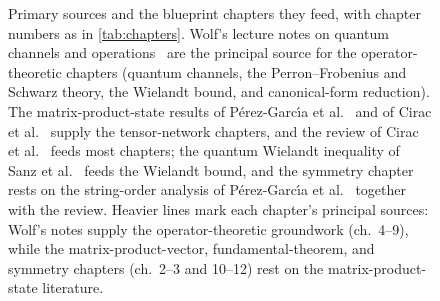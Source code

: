\begin{figure}[htbp]
\begin{tikzpicture}
    \end{tikzpicture}
    \caption{Primary sources and the blueprint chapters they feed, with chapter
        numbers as in \cref{tab:chapters}. Wolf's lecture notes on quantum
        channels and operations~\cite{Wolf2012Quantum} are the principal source
        for the operator-theoretic chapters (quantum channels, the
        Perron--Frobenius and Schwarz theory, the Wielandt bound, and
        canonical-form reduction). The
        matrix-product-state results of P\'erez-Garc\'{\i}a et
        al.~\cite{Perez-Garcia2007Matrix} and of Cirac et
        al.~\cite{Cirac2017Matrixa} supply the tensor-network chapters, and the
        review of Cirac et al.~\cite{Cirac2021Matrix} feeds most chapters; the
        quantum Wielandt inequality of Sanz et al.~\cite{Sanz2010Quantum} feeds
        the Wielandt bound, and the symmetry chapter rests on the string-order
        analysis of P\'erez-Garc\'{\i}a et al.~\cite{Perez-Garcia2008String}
        together with the review. Heavier
        lines mark each chapter's principal sources: Wolf's notes supply the
        operator-theoretic groundwork (ch.~4--9), while the
        matrix-product-vector, fundamental-theorem, and symmetry chapters
        (ch.~2--3 and 10--12) rest on the matrix-product-state
        literature.
        }\label{fig:references}
\end{figure}

